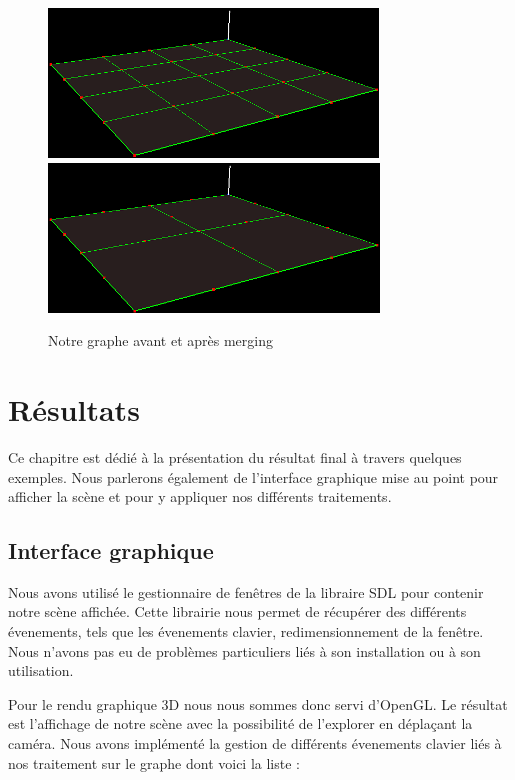 \documentclass[a4paper,12pt]{report}
\begin{document}
\begin{figure}[h]
\centering
\includegraphics[scale=0.6]{Images/maillage.png}
\includegraphics[scale=0.6]{Images/merging.png}
\caption{Notre graphe avant et après merging}
\end{figure}
\vspace{0.5cm}

\chapter{Résultats}

Ce chapitre est dédié à la présentation du résultat final à travers quelques exemples. Nous parlerons également de l'interface graphique mise au point pour afficher la scène et pour y appliquer nos différents traitements.

\section{Interface graphique}

Nous avons utilisé le gestionnaire de fenêtres de la libraire SDL pour contenir notre scène affichée. Cette librairie nous permet de récupérer des différents évenements, tels que les évenements clavier, redimensionnement de la fenêtre. Nous n'avons pas eu de problèmes particuliers liés à son installation ou à son utilisation.

Pour le rendu graphique 3D nous nous sommes donc servi d'OpenGL. Le résultat est l'affichage de notre scène avec la possibilité de l'explorer en déplaçant la caméra. Nous avons implémenté la gestion de différents évenements clavier liés à nos traitement sur le graphe dont voici la liste :
\end{document}

